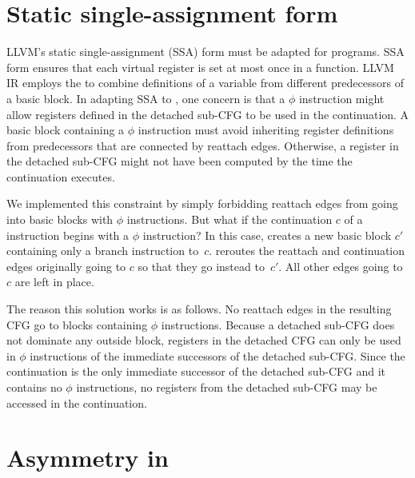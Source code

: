 \section{Static single-assignment form}

LLVM's static single-assignment (SSA) form
\cite[Sec.~6.2.4]{AhoLaSe06} must be adapted for \tapir programs.  SSA
form ensures that each virtual register is set at most once in a
function.  LLVM IR employs the 
\cite[Sec~6.2.4]{AhoLaSe06} to combine definitions of a variable from
different predecessors of a basic block.  In adapting SSA to \tapir,
one concern is that a $\phi$ instruction might allow registers defined
in the detached sub-CFG to be used in the continuation.  A basic block
containing a $\phi$ instruction must avoid inheriting register
definitions from predecessors that are connected by reattach edges.
Otherwise, a register in the detached sub-CFG might not have been
computed by the time the continuation executes.

We implemented this constraint by simply forbidding reattach edges
from going into basic blocks with $\phi$ instructions.  But what if
the continuation $c$ of a \detach instruction begins with a $\phi$
instruction?  In this case, \tapir creates a new basic block $c'$
containing only a branch instruction to~$c$.  \tapir reroutes the reattach
and continuation edges originally going to $c$ so that they go instead
to~$c'$.  All other edges going to $c$ are left in place.

The reason this solution works is as follows.  No reattach edges in
the resulting CFG go to blocks containing $\phi$ instructions.
Because a detached sub-CFG does not dominate any outside block,
registers in the detached CFG can only be used in $\phi$ instructions
of the immediate successors of the detached sub-CFG\@.  Since the
continuation is the only immediate successor of the detached sub-CFG
and it contains no $\phi$ instructions, no registers from the detached
sub-CFG may be accessed in the continuation.


\section{Asymmetry in \tapir}


